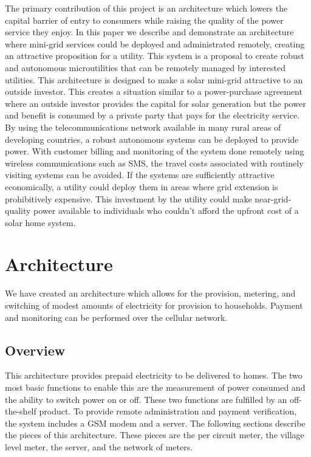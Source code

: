 \documentclass[conference]{IEEEtran}
\begin{document}
The primary contribution of this project is an architecture
which lowers the capital barrier of entry to consumers while
raising the quality of the power service they enjoy.
In this paper we describe and demonstrate an architecture
where mini-grid services could be deployed and administrated
remotely, creating an attractive proposition for a utility.
This system is a proposal to create robust and autonomous
microutilities that can be remotely managed by interested
utilities.
This architecture is designed to make a solar mini-grid attractive
to an outside investor.  This creates a situation similar to
a power-purchase agreement where an outside investor provides the
capital for solar generation but the power and benefit is consumed
by a private party that pays for the electricity service.
By using the telecommunications network available in many rural
areas of developing countries, a robust autonomous systems can
be deployed to provide power.
With customer billing and monitoring of the system done remotely
using wireless communications such as SMS, the travel costs
associated with routinely visiting systems can be avoided.
If the systems are sufficiently attractive economically, a utility could
deploy them in areas where grid extension is prohibitively expensive.
This investment by the utility could make near-grid-quality
power available to individuals who couldn't afford the upfront
cost of a solar home system.

\section{Architecture}
We have created an architecture which allows for the provision,
metering, and switching of modest amounts of electricity for
provision to households.
Payment and monitoring can be performed over the cellular network.

\subsection{Overview}
This architecture provides prepaid electricity to be delivered to 
homes.  The two most basic functions to enable this are the measurement
of power consumed and the ability to switch power on or off.  These
two functions are fulfilled by an off-the-shelf product.  To provide
remote administration and payment verification, the system includes
a GSM modem and a server.  The following sections describe the pieces
of this architecture.  These pieces are the per circuit meter, the 
village level meter, the server, and the network of meters.
\end{document}
